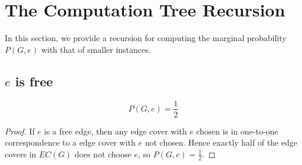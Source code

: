 \section{The Computation Tree Recursion}
In this section, we provide a recursion for computing the marginal probability $P(G, e)$ with that of smaller instances.

\subsection{$e$ is free}
\begin{Prop}
	\[P(G,e) = \frac{1}{2}\]
\end{Prop}
\begin{proof}
	If $e$ is a free edge, then any edge cover with $e$ chosen is in one-to-one correspondence to a edge cover with $e$ not chosen. Hence exactly half of the edge covers in $EC(G)$ does not choose $e$, so $P(G, e) = \frac{1}{2}$.
\end{proof}

